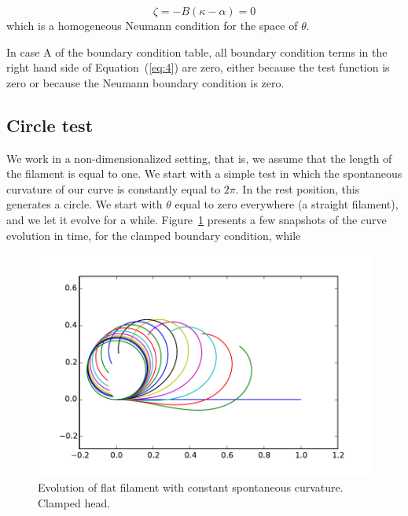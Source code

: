 \documentclass[12pt]{article}
\begin{document}
\[\zeta = -B(\kappa-\alpha) = 0\]
%
which is a homogeneous Neumann condition for the space of $\theta$. 

In case A of the boundary condition table, all boundary condition
terms in the right hand side of Equation~(\ref{eq:4}) are zero, either
because the test function is zero or because the Neumann boundary
condition is zero. 

\subsection{Circle test}\label{circle-test}

We work in a non-dimensionalized setting, that is, we assume that the
length of the filament is equal to one. We start with a simple test in
which the spontaneous curvature of our curve is constantly equal to
$2\pi$. In the rest position, this generates a circle. We start with
$\theta$ equal to zero everywhere (a straight filament), and we let it
evolve for a while. Figure~\ref{fig:circle-clamped} presents a few
snapshots of the curve evolution in time, for the clamped boundary
condition, while

\begin{figure}
  \centering
  \includegraphics[width=\textwidth]{circle_clamped}
  \caption{Evolution of flat filament with constant spontaneous
    curvature. Clamped head.}
  \label{fig:circle-clamped}
\end{figure}
\end{document}
